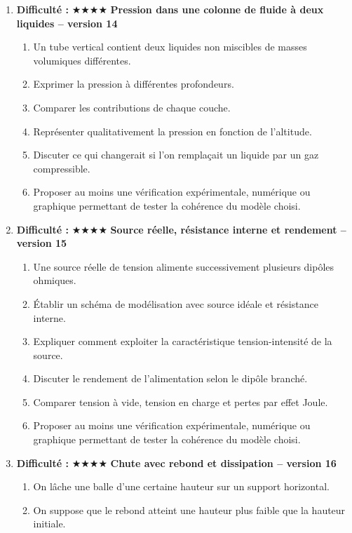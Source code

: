 \documentclass[11pt,a4paper]{article}
\newcommand{\etoiles}[1]{\textbf{Difficulté : }#1}
\begin{document}
\begin{enumerate}[label=\textbf{Problème long \arabic*.},leftmargin=*]
\begin{enumerate}[label=\alph*)]
\item Proposer au moins une vérification expérimentale, numérique ou graphique permettant de tester la cohérence du modèle choisi.
\end{enumerate}
\item \etoiles{★★★★}
\textbf{Pression dans une colonne de fluide à deux liquides -- version 14}
\begin{enumerate}[label=\alph*)]
\item Un tube vertical contient deux liquides non miscibles de masses volumiques différentes.
\item Exprimer la pression à différentes profondeurs.
\item Comparer les contributions de chaque couche.
\item Représenter qualitativement la pression en fonction de l'altitude.
\item Discuter ce qui changerait si l'on remplaçait un liquide par un gaz compressible.
\item Proposer au moins une vérification expérimentale, numérique ou graphique permettant de tester la cohérence du modèle choisi.
\end{enumerate}
\item \etoiles{★★★★}
\textbf{Source réelle, résistance interne et rendement -- version 15}
\begin{enumerate}[label=\alph*)]
\item Une source réelle de tension alimente successivement plusieurs dipôles ohmiques.
\item Établir un schéma de modélisation avec source idéale et résistance interne.
\item Expliquer comment exploiter la caractéristique tension-intensité de la source.
\item Discuter le rendement de l'alimentation selon le dipôle branché.
\item Comparer tension à vide, tension en charge et pertes par effet Joule.
\item Proposer au moins une vérification expérimentale, numérique ou graphique permettant de tester la cohérence du modèle choisi.
\end{enumerate}
\item \etoiles{★★★★}
\textbf{Chute avec rebond et dissipation -- version 16}
\begin{enumerate}[label=\alph*)]
\item On lâche une balle d'une certaine hauteur sur un support horizontal.
\item On suppose que le rebond atteint une hauteur plus faible que la hauteur initiale.

\end{enumerate}
\end{enumerate}
\end{document}
